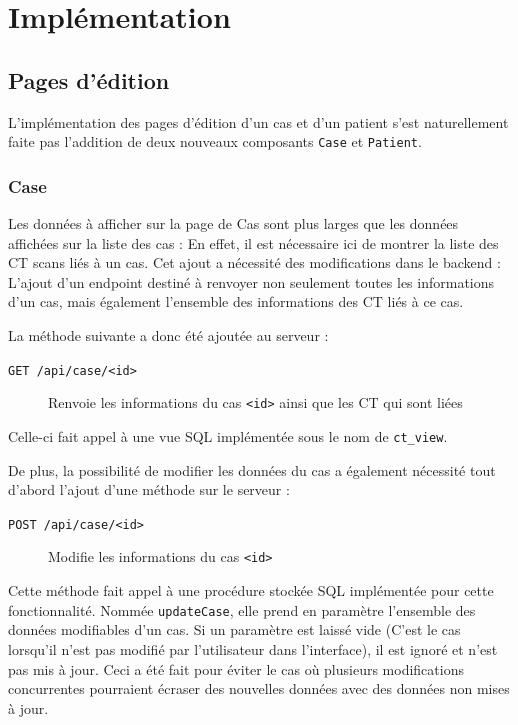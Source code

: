 \section{Implémentation}

	\subsection{Pages d'édition}

		L'implémentation des pages d'édition d'un cas et d'un patient s'est naturellement faite pas l'addition de deux nouveaux composants \texttt{Case} et \texttt{Patient}.

		\subsubsection{Case}

			Les données à afficher sur la page de Cas sont plus larges que les données affichées sur la liste des cas : En effet, il est nécessaire ici de montrer la liste des CT scans liés à un cas. Cet ajout a nécessité des modifications dans le backend : L'ajout d'un endpoint destiné à renvoyer non seulement toutes les informations d'un cas, mais également l'ensemble des informations des CT liés à ce cas.

			La méthode suivante a donc été ajoutée au serveur :
			\begin{description}
				\item[\texttt{GET /api/case/<id>}] Renvoie les informations du cas \texttt{<id>} ainsi que les CT qui sont liées
			\end{description}

			Celle-ci fait appel à une vue SQL implémentée sous le nom de \texttt{ct\_view}.

			De plus, la possibilité de modifier les données du cas a également nécessité tout d'abord l'ajout d'une méthode sur le serveur :

			\begin{description}
				\item[\texttt{POST /api/case/<id>}] Modifie les informations du cas \texttt{<id>}
			\end{description}

			Cette méthode fait appel à une procédure stockée SQL implémentée pour cette fonctionnalité. Nommée \texttt{updateCase}, elle prend en paramètre l'ensemble des données modifiables d'un cas. Si un paramètre est laissé vide (C'est le cas lorsqu'il n'est pas modifié par l'utilisateur dans l'interface), il est ignoré et n'est pas mis à jour. Ceci a été fait pour éviter le cas où plusieurs modifications concurrentes pourraient écraser des nouvelles données avec des données non mises à jour.

